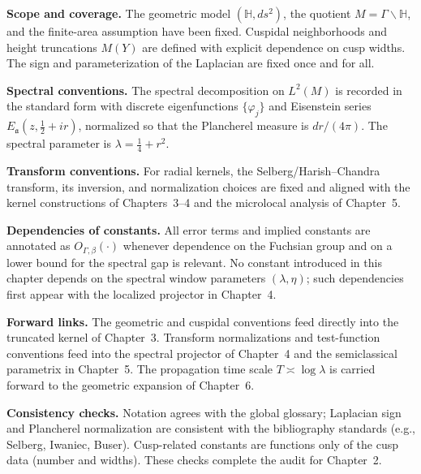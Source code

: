 \noindent\textbf{Scope and coverage.}
The geometric model $(\mathbb{H},ds^2)$, the quotient $M=\Gamma\backslash\mathbb{H}$,
and the finite-area assumption have been fixed. Cuspidal neighborhoods and
height truncations $M(Y)$ are defined with explicit dependence on cusp widths.
The sign and parameterization of the Laplacian are fixed once and for all.

\medskip
\noindent\textbf{Spectral conventions.}
The spectral decomposition on $L^2(M)$ is recorded in the standard form with
discrete eigenfunctions $\{\varphi_j\}$ and Eisenstein series
$E_{\mathfrak a}(z,\tfrac12+ir)$, normalized so that the Plancherel measure
is $dr/(4\pi)$. The spectral parameter is $\lambda=\frac14+r^2$.

\medskip
\noindent\textbf{Transform conventions.}
For radial kernels, the Selberg/Harish–Chandra transform, its inversion, and
normalization choices are fixed and aligned with the kernel constructions of
Chapters~3–4 and the microlocal analysis of Chapter~5.

\medskip
\noindent\textbf{Dependencies of constants.}
All error terms and implied constants are annotated as $O_{\Gamma,\beta}(\cdot)$
whenever dependence on the Fuchsian group and on a lower bound for the spectral
gap is relevant. No constant introduced in this chapter depends on the spectral
window parameters $(\lambda,\eta)$; such dependencies first appear with the
localized projector in Chapter~4.

\medskip
\noindent\textbf{Forward links.}
The geometric and cuspidal conventions feed directly into the truncated kernel
of Chapter~3. Transform normalizations and test-function conventions feed into
the spectral projector of Chapter~4 and the semiclassical parametrix in
Chapter~5. The propagation time scale $T\asymp\log\lambda$ is carried forward
to the geometric expansion of Chapter~6.

\medskip
\noindent\textbf{Consistency checks.}
Notation agrees with the global glossary; Laplacian sign and Plancherel
normalization are consistent with the bibliography standards (e.g., Selberg,
Iwaniec, Buser). Cusp-related constants are functions only of the cusp data
(number and widths). These checks complete the audit for Chapter~2.
